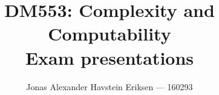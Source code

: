 \documentclass[12pt]{article}
\begin{document}
\title{DM553: Complexity and Computability \\ Exam presentations}
\author{Jonas Alexander Havstein Eriksen --- 160293}
\date{\vspace{-5ex}}

\maketitle

\tableofcontents

\newpage 

\newpage 

\newpage

\newpage

\newpage

\newpage

\newpage

\newpage

\newpage

\newpage

\newpage

\end{document}

